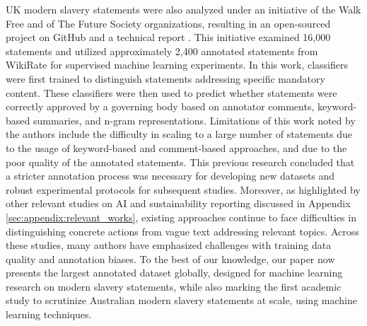 UK modern slavery statements were also analyzed under an initiative of the Walk Free and of The Future Society organizations, resulting in an open-sourced project on GitHub \citep{tfs2022projectaims} and a technical report \citep{weinberg2020ai}. This initiative examined 16,000 statements and utilized approximately 2,400 annotated statements from WikiRate \citep{WikiRate2023} for supervised machine learning experiments. In this work, classifiers were first trained to distinguish statements addressing specific mandatory content. These classifiers were then used to predict whether statements were correctly approved by a governing body based on annotator comments, keyword-based summaries, and n-gram representations. Limitations of this work noted by the authors include the difficulty in scaling to a large number of statements due to the usage of keyword-based and comment-based approaches, and due to the poor quality of the annotated statements. This previous research concluded that a stricter annotation process was necessary for developing new datasets and robust experimental protocols for subsequent studies. 
Moreover, as highlighted by other relevant studies on AI and sustainability reporting discussed in Appendix \ref{sec:appendix:relevant_works}, existing approaches continue to face difficulties in distinguishing concrete actions from vague text addressing relevant topics. Across these studies, many authors have emphasized challenges with training data quality and annotation biases. To the best of our knowledge, our paper now presents the largest annotated dataset globally, designed for machine learning research on modern slavery statements, while also marking the first academic study to scrutinize Australian modern slavery statements at scale, using machine learning techniques.